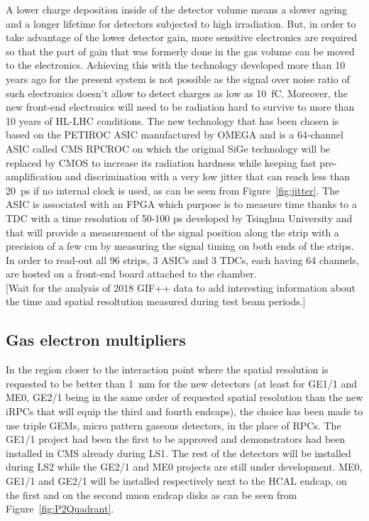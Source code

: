 	A lower charge deposition inside of the detector volume means a slower ageing and a longer lifetime for detectors subjected to high irradiation. But, in order to take advantage of the lower detector gain, more sensitive electronics are required so that the part of gain that was formerly done in the gas volume can be moved to the electronics. Achieving this with the technology developed more than 10 years ago for the present system is not possible as the signal over noise ratio of such electronics doesn't allow to detect charges as low as \SI{10}{fC}. Moreover, the new front-end electronics will need to be radiation hard to survive to more than 10 years of HL-LHC conditions. The new technology that has been chosen is based on the PETIROC ASIC manufactured by OMEGA and is a 64-channel ASIC called CMS RPCROC on which the original SiGe technology will be replaced by CMOS to increase its radiation hardness while keeping fast pre-amplification and discrimination with a very low jitter that can reach less than \SI{20}{ps} if no internal clock is used, as can be seen from Figure~\ref{fig:jitter}. The ASIC is associated with an FPGA which purpose is to measure time thanks to a TDC with a time resolution of 50-100 \si{ps} developed by Tsinghua University and that will provide a measurement of the signal position along the strip with a precision of a few \si{cm} by measuring the signal timing on both ends of the strips. In order to read-out all 96 strips, 3 ASICs and 3 TDCs, each having 64 channels, are hosted on a front-end board attached to the chamber.\\
	
	{\color{blue}[Wait for the analysis of 2018 GIF++ data to add interesting information about the time and spatial resoltution measured during test beam periods.]\\}
	
	\subsection{Gas electron multipliers}
	\label{chapt3:ssec:GEMs}
	
	In the region closer to the interaction point where the spatial resolution is requested to be better than \SI{1}{mm} for the new detectors (at least for GE1/1 and ME0, GE2/1 being in the same order of requested spatial resolution than the new iRPCs that will equip the third and fourth endcaps), the choice has been made to use triple GEMs, micro pattern gaseous detectors, in the place of RPCs. The GE1/1 project had been the first to be approved and demonstrators had been installed in CMS already during LS1. The rest of the detectors will be installed during LS2 while the GE2/1 and ME0 projects are still under development. ME0, GE1/1 and GE2/1 will be installed respectively next to the HCAL endcap, on the first and on the second muon endcap disks as can be seen from Figure~\ref{fig:P2Quadrant}.


